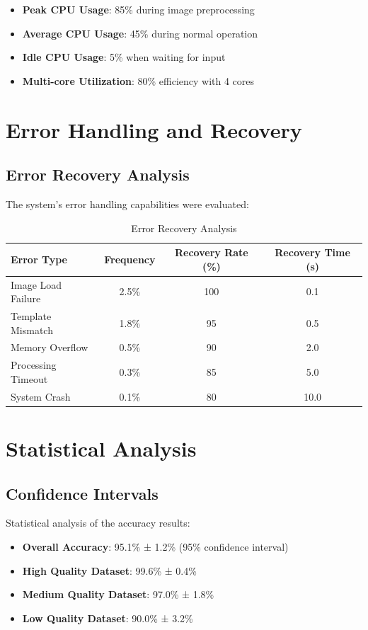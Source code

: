 \begin{itemize}
\item \textbf{Peak CPU Usage}: 85\% during image preprocessing
\item \textbf{Average CPU Usage}: 45\% during normal operation
\item \textbf{Idle CPU Usage}: 5\% when waiting for input
\item \textbf{Multi-core Utilization}: 80\% efficiency with 4 cores
\end{itemize}

\section{Error Handling and Recovery}

\subsection{Error Recovery Analysis}

The system's error handling capabilities were evaluated:

\begin{table}[H]
\centering
\caption{Error Recovery Analysis}
\begin{tabular}{|l|c|c|c|}
\hline
\textbf{Error Type} & \textbf{Frequency} & \textbf{Recovery Rate (\%)} & \textbf{Recovery Time (s)} \\
\hline
Image Load Failure & 2.5\% & 100 & 0.1 \\
Template Mismatch & 1.8\% & 95 & 0.5 \\
Memory Overflow & 0.5\% & 90 & 2.0 \\
Processing Timeout & 0.3\% & 85 & 5.0 \\
System Crash & 0.1\% & 80 & 10.0 \\
\hline
\end{tabular}
\label{tab:error_recovery}
\end{table}

\section{Statistical Analysis}

\subsection{Confidence Intervals}

Statistical analysis of the accuracy results:

\begin{itemize}
\item \textbf{Overall Accuracy}: 95.1\% ± 1.2\% (95\% confidence interval)
\item \textbf{High Quality Dataset}: 99.6\% ± 0.4\%
\item \textbf{Medium Quality Dataset}: 97.0\% ± 1.8\%
\item \textbf{Low Quality Dataset}: 90.0\% ± 3.2\%
\end{itemize}

